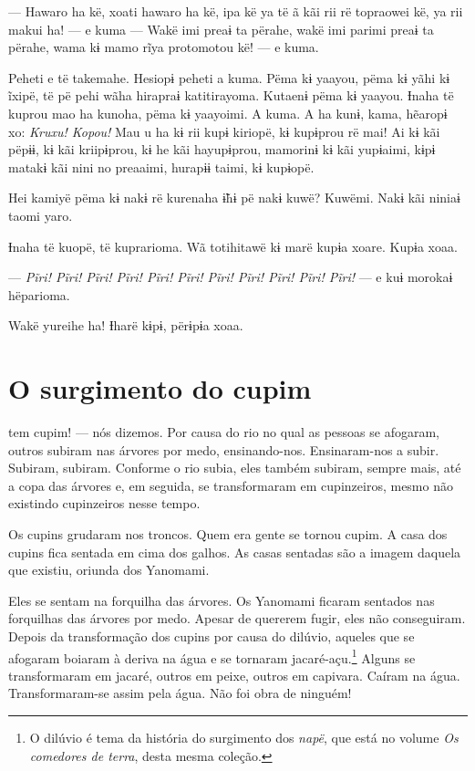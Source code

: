 --- Hawaro ha kë, xoati hawaro ha kë, ipa kë ya të ã kãi rii rë
topraowei kë, ya rii makui ha! --- e kuma --- Wakë imi preaɨ ta përahe,
wakë imi parimi preaɨ ta përahe, wama kɨ mamo rĩya protomotou kë! --- e
kuma. 

Peheti e të takemahe. Hesiopɨ peheti a kuma. Pëma kɨ yaayou, pëma kɨ
 yãhi kɨ ĩxipë, të pë pehi wãha hirapraɨ katitirayoma. Kutaenɨ pëma kɨ
 yaayou. Ɨnaha të kuprou mao ha kunoha, pëma kɨ yaayoimi. A kuma. A ha
 kunɨ, kama, hẽaropɨ xo: \textit{Kruxu! Kopou!} Mau u ha kɨ rii kupɨ kiriopë, kɨ
 kupɨprou rë mai! Ai kɨ kãi pëpɨɨ, kɨ kãi kriipɨprou, kɨ he kãi
 hayupɨprou, mamorinɨ kɨ kãi yupɨaimi, kɨpɨ matakɨ kãi nini no preaaimi,
 hurapɨɨ taimi, kɨ kupɨopë.

Hei kamiyë pëma kɨ nakɨ rë kurenaha ɨ̃hɨ pë nakɨ kuwë? Kuwëmi. Nakɨ kãi
niniaɨ taomi yaro. 

Ɨnaha të kuopë, të kuprarioma. Wã totihitawë kɨ marë kupɨa xoare. Kupɨa
xoaa. 

--- \textit{Pĩri! Pĩri! Pĩri! Pĩri! Pĩri! Pĩri! Pĩri! Pĩri! Pĩri! Pĩri! Pĩri!}
--- e kuɨ morokaɨ hëparioma. 

Wakë yureihe ha! Ɨharë kɨpɨ, përɨpɨa xoaa. 

\chapter{O surgimento do cupim}

 tem cupim! --- nós dizemos. 
Por causa do rio no qual as pessoas se afogaram, outros subiram nas
árvores por medo, ensinando-nos. Ensinaram-nos a subir. Subiram,
subiram. Conforme o rio subia, eles também subiram, sempre mais, até a
copa das árvores e, em seguida, se transformaram em cupinzeiros, mesmo
não existindo cupinzeiros nesse tempo. 

Os cupins grudaram nos troncos. Quem era gente se tornou cupim. A casa
 dos cupins fica sentada em cima dos galhos. As casas sentadas são a
 imagem daquela que existiu, oriunda dos Yanomami.

Eles se sentam na forquilha das árvores. Os Yanomami ficaram sentados
 nas forquilhas das árvores por medo. Apesar de quererem fugir, eles não
 conseguiram. Depois da transformação dos cupins por causa do dilúvio,
 aqueles que se afogaram boiaram à deriva na água e se tornaram
 jacaré-açu.\footnote{O dilúvio é tema da história do surgimento dos \textit{napë}, que está no volume \textit{Os comedores de terra}, desta mesma coleção.} Alguns se transformaram em jacaré, outros em peixe, outros em capivara. Caíram na água. Transformaram-se
 assim pela água. Não foi obra de ninguém!

